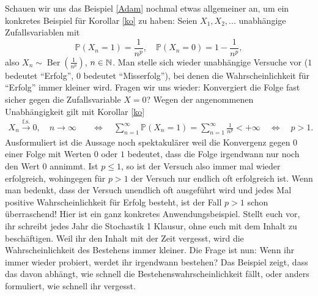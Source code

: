 \begin{beispiel}
Schauen wir uns das Beispiel \ref{Adam} nochmal etwas allgemeiner an, um ein konkretes Beispiel f\"ur Korollar \ref{ko} zu haben: Seien $X_1, X_2, ... $ unabh\"angige Zufallsvariablen mit $$\mathbb{P}(X_n = 1) = \frac{1}{n^p}, \quad \mathbb{P}(X_n = 0) = 1 - \frac{1}{n^p},$$ also $X_n \sim \operatorname{Ber}(\frac{1}{n^p})$, $n \in \mathbb{N}$. Man stelle sich wieder unabh\"angige Versuche vor ($1$ bedeutet \enquote{Erfolg}, $0$ bedeutet \enquote{Misserfolg}), bei denen die Wahrscheinlichkeit f\"ur \enquote{Erfolg} immer kleiner wird. Fragen wir uns wieder: Konvergiert die Folge fast sicher gegen die Zufallsvariable $X=0$? Wegen der angenommenen Unabh\"angigkeit gilt mit Korollar \ref{ko} 
\begin{align*}
	X_n\overset{\text{f.s.}}{\to} 0,\quad n\to\infty \quad &\Leftrightarrow\quad \sum_{n=1}^\infty \mathbb P(X_n=1)=\sum_{n=1}^\infty \frac{1}{n^p}<+\infty\quad
	\Leftrightarrow\quad p>1.
\end{align*}
Ausformuliert ist die Aussage noch spektakul\"arer weil die Konvergenz gegen $0$ einer Folge mit Werten $0$ oder $1$ bedeutet, dass die Folge irgendwann nur noch den Wert $0$ annimmt. Ist $p\leq 1$, so ist der Versuch also immer mal wieder erfolgreich, wohingegen f\"ur $p>1$ der Versuch nur endlich oft erfolgreich ist. Wenn man bedenkt, dass der Versuch unendlich oft ausgef\"uhrt wird und jedes Mal positive Wahrscheinlichkeit f\"ur Erfolg besteht, ist der Fall $p>1$ schon \"uberraschend! Hier ist ein ganz konkretes Anwendungsbeispiel. Stellt euch vor, ihr schreibt jedes Jahr die Stochastik 1 Klausur, ohne euch mit dem Inhalt zu besch\"aftigen. Weil ihr den Inhalt mit der Zeit vergesst, wird die Wahrscheinlichkeit des Bestehens immer kleiner. Die Frage ist nun: Wenn ihr immer wieder probiert, werdet ihr irgendwann bestehen? Das Beispiel zeigt, dass das davon abh\"angt, wie schnell die Bestehenswahrscheinlichkeit f\"allt, oder anders formuliert, wie schnell ihr vergesst.
\end{beispiel}




